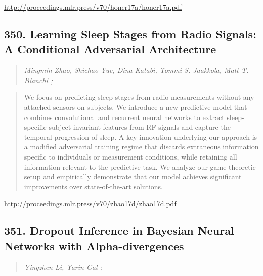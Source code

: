 \documentclass{article}
\begin{document}
\href{http://proceedings.mlr.press/v70/honer17a/honer17a.pdf}{http://proceedings.mlr.press/v70/honer17a/honer17a.pdf}

\subsection{350. Learning Sleep Stages from Radio Signals: A Conditional Adversarial Architecture}

\begin{quote}
\footnotesize{\textit{Mingmin Zhao, Shichao Yue, Dina Katabi, Tommi S. Jaakkola, Matt T. Bianchi ;}}

\end{quote}

\begin{quote}
    We focus on predicting sleep stages from radio measurements without any attached sensors on subjects. We introduce a new predictive model that combines convolutional and recurrent neural networks to extract sleep-specific subject-invariant features from RF signals and capture the temporal progression of sleep. A key innovation underlying our approach is a modified adversarial training regime that discards extraneous information specific to individuals or measurement conditions, while retaining all information relevant to the predictive task. We analyze our game theoretic setup and empirically demonstrate that our model achieves significant improvements over state-of-the-art solutions.  
\end{quote}

\href{http://proceedings.mlr.press/v70/zhao17d/zhao17d.pdf}{http://proceedings.mlr.press/v70/zhao17d/zhao17d.pdf}

\subsection{351. Dropout Inference in Bayesian Neural Networks with Alpha-divergences}

\begin{quote}
\footnotesize{\textit{Yingzhen Li, Yarin Gal ;}}

\end{quote}
\end{document}
